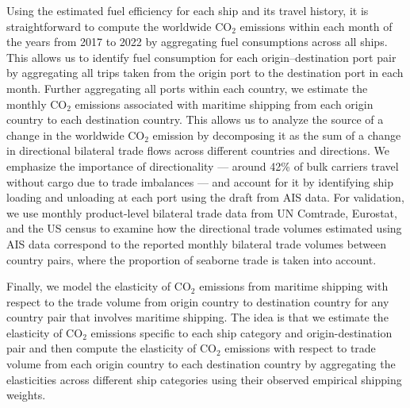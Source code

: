\documentclass[hidelinks, 12pt,letterpaper]{article}
\begin{document}
Using the estimated fuel efficiency for each ship and its travel history, it is straightforward to compute the worldwide CO$_2$ emissions within each month of the years from 2017 to 2022 by aggregating fuel consumptions across all ships. This allows us to identify fuel consumption for each origin--destination port pair
by aggregating all trips taken from the origin port to the destination port in each month. Further aggregating all ports within each country, we estimate the monthly CO$_2$ emissions associated with maritime shipping from each origin country to each destination country.
This allows us to analyze the source of a change in the worldwide CO$_2$ emission by decomposing it as the sum of a change in directional bilateral trade flows across different countries and directions. We emphasize the importance of directionality --- around 42\% of bulk carriers travel without cargo due to trade imbalances \citep{brancaccio2020geography} --- and account for it by identifying ship loading and unloading at each port using the draft from AIS data. For validation, we use monthly  product-level bilateral trade data from UN Comtrade, Eurostat, and the US census to examine how the directional trade volumes estimated using AIS data correspond to the reported monthly bilateral trade volumes between country pairs, where the proportion of seaborne trade is taken into account. 


Finally, we model the elasticity of CO$_2$ emissions from maritime shipping with respect to the trade volume from origin country to destination country for any country pair that involves maritime shipping. The idea is that we estimate  the elasticity of CO$_2$ emissions specific to each ship category and origin-destination pair and then compute the elasticity of CO$_2$ emissions with respect to trade volume from each origin country to each destination country by aggregating the elasticities across different ship categories using their  observed empirical shipping weights.
\end{document}
